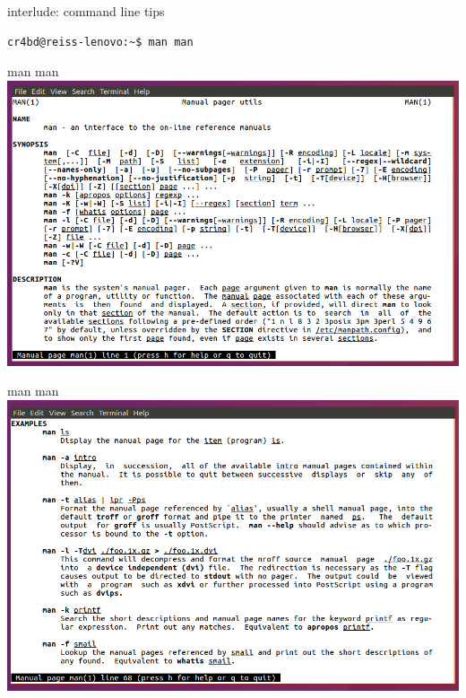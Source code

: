 
\begin{frame}[fragile]{interlude: command line tips}
\begin{verbatim}
cr4bd@reiss-lenovo:~$ man man
\end{verbatim}
\end{frame}

\begin{frame}[fragile]{man man}
\includegraphics[width=.95\textwidth]{../commandLineTips/manman}
\end{frame}

\begin{frame}[fragile]{man man}
\includegraphics[width=.95\textwidth]{../commandLineTips/manman-examples}
\end{frame}
